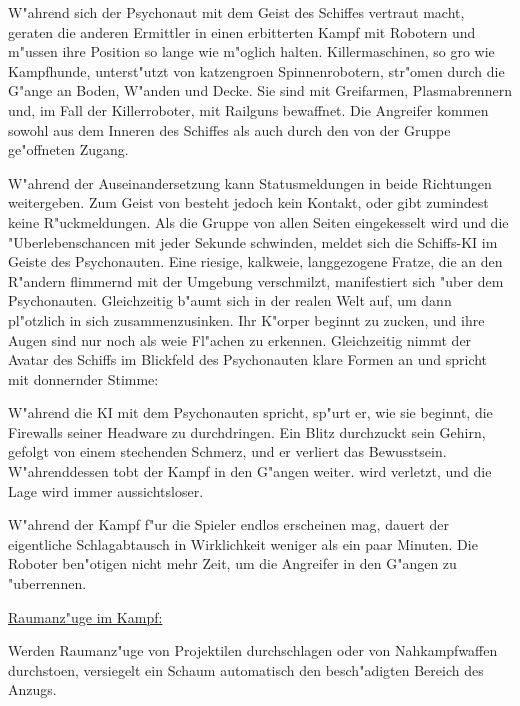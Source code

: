 W"ahrend sich der Psychonaut mit dem Geist des Schiffes vertraut macht, geraten die anderen Ermittler in einen erbitterten Kampf mit Robotern und m"ussen ihre Position so lange wie m"oglich halten. Killermaschinen, so gro\3 wie Kampfhunde, unterst"utzt von katzengro\3en Spinnenrobotern, str"omen durch die G"ange an Boden, W"anden und Decke. Sie sind mit Greifarmen, Plasmabrennern und, im Fall der Killerroboter, mit Railguns bewaffnet. Die Angreifer kommen sowohl aus dem Inneren des Schiffes als auch durch den von der Gruppe ge"offneten Zugang. 

W"ahrend der Auseinandersetzung kann \ml{} Statusmeldungen in beide Richtungen weitergeben. Zum Geist von \xl{} besteht jedoch kein Kontakt, oder \ml{} gibt zumindest keine R"uckmeldungen. Als die Gruppe von allen Seiten eingekesselt wird und die "Uberlebenschancen mit jeder Sekunde schwinden, meldet sich die Schiffs-KI im Geiste des Psychonauten. Eine riesige, kalkwei\3e, langgezogene Fratze, die an den R"andern flimmernd mit der Umgebung verschmilzt, manifestiert sich "uber dem Psychonauten. Gleichzeitig b"aumt sich \xl{} in der realen Welt auf, um dann pl"otzlich in sich zusammenzusinken. Ihr K"orper beginnt zu zucken, und ihre Augen sind nur noch als wei\3e Fl"achen zu erkennen. Gleichzeitig nimmt der Avatar des Schiffs im Blickfeld des Psychonauten klare Formen an und spricht mit donnernder Stimme:


W"ahrend die KI mit dem Psychonauten spricht, sp"urt er, wie sie beginnt, die Firewalls seiner Headware zu durchdringen. Ein Blitz durchzuckt sein Gehirn, gefolgt von einem stechenden Schmerz, und er verliert das Bewusstsein. W"ahrenddessen tobt der Kampf in den G"angen weiter. \ml{} wird verletzt, und die Lage wird immer aussichtsloser.

\begin{remarks}
    W"ahrend der Kampf f"ur die Spieler endlos erscheinen mag, dauert der eigentliche Schlagabtausch in Wirklichkeit weniger als ein paar Minuten. Die Roboter ben"otigen nicht mehr Zeit, um die Angreifer in den G"angen zu "uberrennen.

    \underline{Raumanz"uge im Kampf:}

    Werden Raumanz"uge von Projektilen durchschlagen oder von Nahkampfwaffen durchsto\3en, versiegelt ein Schaum automatisch den besch"adigten Bereich des Anzugs.
\end{remarks}    

